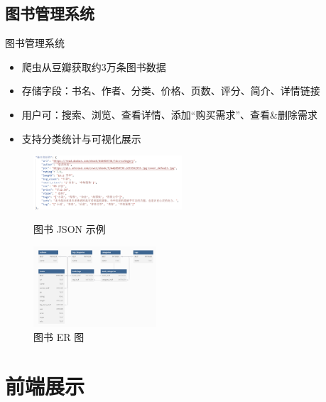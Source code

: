 \documentclass{ctexbeamer}
\begin{document}
\subsection{图书管理系统}
\begin{frame}{图书管理系统}
  \begin{itemize}
    \item 爬虫从豆瓣获取约3万条图书数据
    \item 存储字段：书名、作者、分类、价格、页数、评分、简介、详情链接
    \item 用户可：搜索、浏览、查看详情、添加“购买需求”、查看\&删除需求
    \item 支持分类统计与可视化展示
  \end{itemize}
  \vspace{0.3cm}
  \begin{figure}
    \centering
    \begin{minipage}{0.3\textwidth}
      \centering
      \includegraphics[height=2cm]{fig/bookJSON.png}
      \caption{图书 JSON 示例}
    \end{minipage}
    \hfill
    \begin{minipage}{0.45\textwidth}
      \centering
      \includegraphics[height=3cm]{fig/bookER.png}
      \caption{图书 ER 图}
    \end{minipage}
  \end{figure}
\end{frame}

\section{前端展示}
\end{document}
